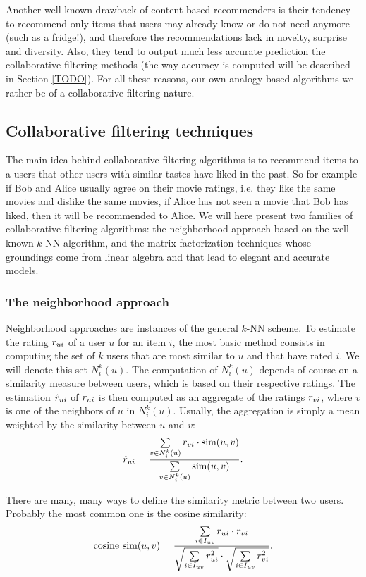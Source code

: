 Another well-known drawback of content-based recommenders is their tendency to
recommend only items that users may already know or do not need anymore (such
as a fridge!), and therefore the recommendations lack in novelty, surprise and
diversity. Also, they tend to output much less accurate prediction the
collaborative filtering methods (the way accuracy is computed will be described
in Section \ref{TODO}). For all these reasons, our own analogy-based algorithms
we rather be of a collaborative filtering nature.

\subsection{Collaborative filtering techniques}
\label{SEC:collaborative_filtering}

The main idea behind collaborative filtering algorithms is to recommend items
to a users that other users with similar tastes have liked in the past. So for
example if Bob and Alice usually agree on their movie ratings, i.e. they like
the same movies and dislike the same movies, if Alice has not seen a movie that
Bob has liked, then it will be recommended to Alice. We will here present two
families of collaborative filtering algorithms: the neighborhood approach based
on the well known $k$-NN algorithm, and the matrix factorization techniques
whose groundings come from linear algebra and that lead to elegant and accurate
models.

\subsubsection{The neighborhood approach}

Neighborhood approaches are instances of the general $k$-NN scheme. To estimate
the rating $r_{ui}$ of a user $u$ for an item $i$, the most basic method consists
in computing  the set of $k$ users that are most similar to $u$ and
that have rated $i$. We will denote this set $N_i^k(u)$. The computation of
$N_i^k(u)$ depends of course on a similarity measure between users, which is
based on their respective ratings.  The estimation $\hat{r}_{ui}$ of $r_{ui}$ is then
computed as an aggregate of the ratings $r_{vi}$, where $v$ is one of the
neighbors of $u$ in $N_i^k(u)$. Usually, the aggregation is simply a mean
weighted by the similarity between $u$ and $v$:
$$\hat{r}_{ui} = \frac{\sum\limits_{v \in N_i^k(u)} r_{vi} \cdot \text{sim}(u, v)}
{\sum\limits_{v \in N_i^k(u)}\text{sim}(u, v)}.$$

There are many, many ways to define the similarity metric between two users.
Probably the most common one is the cosine similarity:
$$
\text{cosine sim}(u, v) = \frac{ \sum\limits_{i \in I_{uv}} r_{ui} \cdot r_{vi}}
{\sqrt{\sum\limits_{i \in I_{uv}} r_{ui}^2} \cdot \sqrt{\sum\limits_{i \in I_{uv}}
r_{vi}^2}}.
$$

